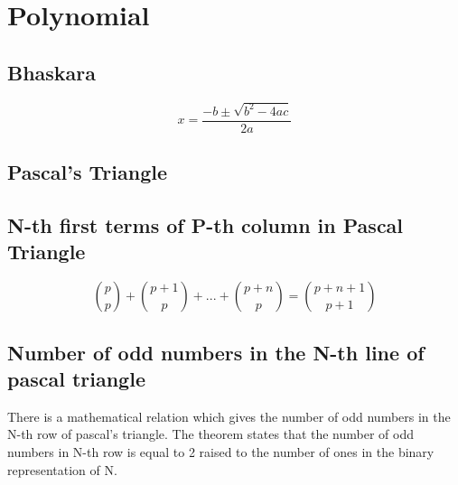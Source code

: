 \section{Polynomial}

\subsection{Bhaskara}
\begin{equation}\label{eq:bhaskara}
x = \frac{{-b \pm \sqrt{{b^2 - 4ac}}}}{{2a}}
\end{equation}

\subsection{Pascal's Triangle}


\subsection{N-th first terms of P-th column in Pascal Triangle}

\begin{equation}
    \binom{p}{p} + \binom{p+1}{p} + ... + \binom{p+n}{p} = \binom{p+n+1}{p+1}
\end{equation}

\subsection{Number of odd numbers in the N-th line of pascal triangle}

There is a mathematical relation which gives the number of odd numbers in the N-th row of pascal's triangle. The theorem states that the number of odd numbers in N-th row is equal to 2 raised to the number of ones in the binary representation of N.

